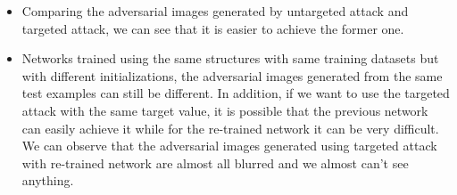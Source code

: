 \documentclass{article}
\begin{document}
\begin{enumerate}
        \begin{itemize}
    	\item
    	Comparing the adversarial images generated by untargeted attack and targeted attack, we can see that it is easier to achieve the former one.\\
    	
    	\item
        Networks trained using the same structures with same training datasets but with different initializations, the adversarial images generated from the same test examples can still be different. In addition, if we want to use the targeted attack with the same target value, it is possible that the previous network can easily achieve it while for the re-trained network it can be very difficult. We can observe that the adversarial images generated using targeted attack with re-trained network are almost all blurred and we almost can't see anything.

    \end{itemize}
    \end{enumerate}
    
        
\end{document}
